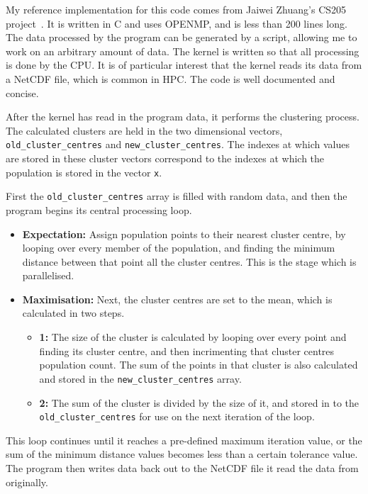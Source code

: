 My reference implementation for this code comes from Jaiwei Zhuang's CS205 project~\cite{CS205}. It is written in C and uses OPENMP, and is less than 200 lines long. The data processed by the program can be generated by a script, allowing me to work on an arbitrary amount of data. The kernel is written so that all processing is done by the CPU\@. It is of particular interest that the kernel reads its data from a NetCDF file, which is common in HPC\@. The code is well documented and concise.

After the kernel has read in the program data, it performs the clustering process. The calculated clusters are held in the two dimensional vectors, \texttt{old\_cluster\_centres} and \texttt{new\_cluster\_centres}. The indexes at which values are stored in these cluster vectors correspond to the indexes at which the population is stored in the vector \texttt{x}.

First the \texttt{old\_cluster\_centres} array is filled with random data, and then the program begins its central processing loop.

\begin{itemize}
  \item \textbf{Expectation:} Assign population points to their nearest cluster centre, by looping over every member of the population, and finding the minimum distance between that point all the cluster centres. This is the stage which is parallelised.
  \item \textbf{Maximisation:} Next, the cluster centres are set to the mean, which is calculated in two steps.
  \begin{itemize}
    \item \textbf{1:} The size of the cluster is calculated by looping over every point and finding its cluster centre, and then incrimenting that cluster centres population count. The sum of the points in that cluster is also calculated and stored in the \texttt{new\_cluster\_centres} array.
   \item \textbf{2:} The sum of the cluster is divided by the size of it, and stored in to the \texttt{old\_cluster\_centres} for use on the next iteration of the loop.
   \end{itemize}
\end{itemize}
This loop continues until it reaches a pre-defined maximum iteration value, or the sum of the minimum distance values becomes less than a certain tolerance value. The program then writes data back out to the NetCDF file it read the data from originally.

